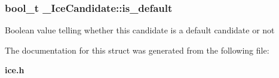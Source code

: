 \subsubsection[{is\_\-default}]{\setlength{\rightskip}{0pt plus 5cm}bool\_\-t {\bf \_\-IceCandidate::is\_\-default}}\label{struct__IceCandidate_aa326e8dca696ab5311c8316133da5937}
Boolean value telling whether this candidate is a default candidate or not 

The documentation for this struct was generated from the following file:\begin{DoxyCompactItemize}
\item 
{\bf ice.h}\end{DoxyCompactItemize}
